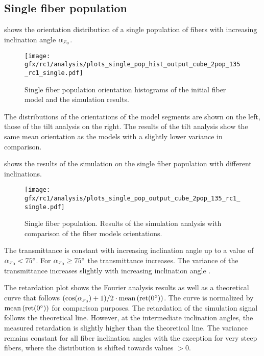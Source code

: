 \subsection{Single fiber population}
\label{sec:resSingleIncl}
%
 shows the orientation distribution of a single population of fibers with increasing inclination angle $\modelInc{}$.
%
\begin{figure}[!t]
    \centering
    \texttt{[image: gfx/rc1/analysis/plots\_single\_pop\_hist\_output\_cube\_2pop\_135\_rc1\_single.pdf]}
    \caption[]{Single fiber population orientation histograms of the initial fiber model and the simulation results.}
    \label{fig:single_fiber_pop_hist}
\end{figure}
%
The distributions of the orientations of the model segments are shown on the left, those of the tilt analysis on the right.
The results of the tilt analysis show the same mean orientation as the models with a slightly lower variance in comparison.
\par
%
 shows the results of the simulation on the single fiber population with different inclinations.
\par
%
\begin{figure}[!p]
    \centering
    \texttt{[image: gfx/rc1/analysis/plots\_single\_pop\_output\_cube\_2pop\_135\_rc1\_single.pdf]}
    \caption[]{Single fiber population. Results of the simulation analysis with comparison of the fiber models orientations.}
    \label{fig:single_fiber_pop_rofl}
\end{figure}
%
The transmittance is constant with increasing inclination angle up to a value of $\modelInc<\SI{75}{\degree}$.
For $\modelInc \ge \SI{75}{\degree}$ the transmittance increases.
The variance of the transmittance increases slightly with increasing inclination angle \modelInc{}.
\par
%
The retardation plot shows the Fourier analysis results as well as a theoretical curve that follows $(\cos(\modelInc) + 1) / 2 \cdot \mean\left(\mathrm{ret}(\SI{0}{\degree})\right)$.
The curve is normalized by $\operatorname{mean}\left(\mathrm{ret}(\SI{0}{\degree})\right)$ for comparison purposes.
The retardation of the simulation signal follows the theoretical line.
However, at the intermediate inclination angles, the measured retardation is slightly higher than the theoretical line.
The variance remains constant for all fiber inclination angles \modelInc{} with the exception for very steep fibers, where the distribution is shifted towards values $>0$.
